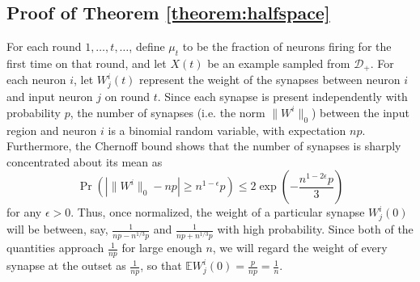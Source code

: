 \documentclass[final,12pt]{colt2022} %
\newcommand{\E}{\mathbb{E}}
\begin{document}
\subsection*{Proof of Theorem \ref{theorem:halfspace}} \label{appendix:halfspace}
For each round $1, \ldots, t, \ldots$, define $\mu_t$ to be the fraction of neurons firing for the first time on that round, and let $X(t)$ be an example sampled from $\mathcal D_+$. For each neuron $i$, let $W_j^i(t)$ represent the weight of the synapses between neuron $i$ and input neuron $j$ on round $t$. Since each synapse is present independently with probability $p$, the number of synapses (i.e. the norm $\|W^i\|_0$) between the input region and neuron $i$ is a binomial random variable, with expectation $np$. Furthermore, the Chernoff bound shows that the number of synapses is sharply concentrated about its mean as \[\Pr(|\|W^i\|_0 - np | \ge n^{1-\epsilon}p) \le 2\exp\left(-\frac{n^{1-2\epsilon}p}{3}\right)\] for any $\epsilon > 0$. Thus, once normalized, the weight of a particular synapse $W_j^i(0)$ will be between, say, $\frac{1}{np-n^{1/3}p}$ and $\frac{1}{np+n^{1/3}p}$ with high probability. Since both of the quantities approach $\frac{1}{np}$ for large enough $n$, we will regard the weight of every synapse at the outset as $\frac{1}{np}$, so that $\E W_j^i(0) = \frac{p}{np} = \frac{1}{n}$.
\end{document}
